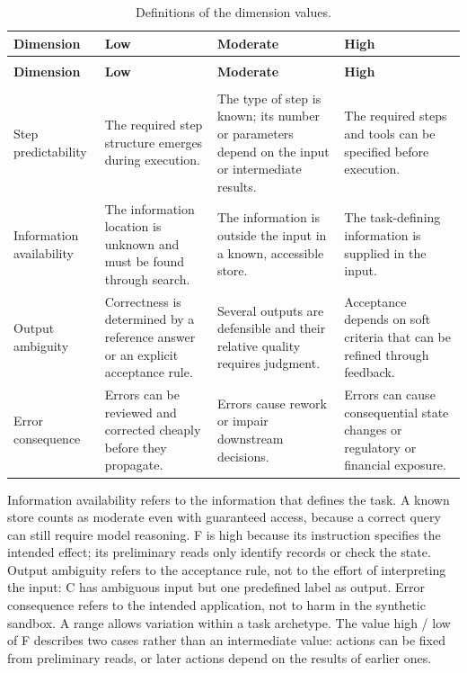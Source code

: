 \begingroup
\renewcommand{\baselinestretch}{1}
\small
\setlength{\tabcolsep}{4pt}
\renewcommand{\arraystretch}{1.08}
\begin{longtable}{>{\raggedright\arraybackslash}p{} >{\raggedright\arraybackslash}p{} >{\raggedright\arraybackslash}p{} >{\raggedright\arraybackslash}p{}}
\caption[Definitions of the dimension values]{Definitions of the dimension values.}\label{tab:app-dimension-anchors} \\
\toprule
\textbf{Dimension} & \textbf{Low} & \textbf{Moderate} & \textbf{High} \\
\midrule
\endfirsthead
\multicolumn{4}{l}{\tablename~\thetable{} (continued)} \\
\toprule
\textbf{Dimension} & \textbf{Low} & \textbf{Moderate} & \textbf{High} \\
\midrule
\endhead
\midrule
\multicolumn{4}{r}{\emph{Continued on the next page.}} \\
\endfoot
\bottomrule
\endlastfoot
Step predictability & The required step structure emerges during execution. & The type of step is known; its number or parameters depend on the input or intermediate results. & The required steps and tools can be specified before execution. \\
\addlinespace[2.5pt]
Information availability & The information location is unknown and must be found through search. & The information is outside the input in a known, accessible store. & The task-defining information is supplied in the input. \\
\addlinespace[2.5pt]
Output ambiguity & Correctness is determined by a reference answer or an explicit acceptance rule. & Several outputs are defensible and their relative quality requires judgment. & Acceptance depends on soft criteria that can be refined through feedback. \\
\addlinespace[2.5pt]
Error consequence & Errors can be reviewed and corrected cheaply before they propagate. & Errors cause rework or impair downstream decisions. & Errors can cause consequential state changes or regulatory or financial exposure. \\
\end{longtable}
\endgroup

Information availability refers to the information that defines the task. A known store counts as moderate even with guaranteed access, because a correct query can still require model reasoning. F is high because its instruction specifies the intended effect; its preliminary reads only identify records or check the state. Output ambiguity refers to the acceptance rule, not to the effort of interpreting the input: C has ambiguous input but one predefined label as output. Error consequence refers to the intended application, not to harm in the synthetic sandbox. A range allows variation within a task archetype. The value high / low of F describes two cases rather than an intermediate value: actions can be fixed from preliminary reads, or later actions depend on the results of earlier ones.

